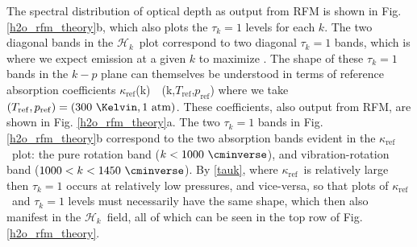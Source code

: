 \documentclass[10pt]{article}
\newcommand{\ch}{\ensuremath{\mathcal{H}}}
\newcommand{\chk}{\ensuremath{\ch_k}}
\newcommand{\tauk}{\ensuremath{\tau_k}}
\newcommand{\kapparef}{\ensuremath{\kappa_{\mathrm{ref}}}}
\newcommand{\Tref}{\ensuremath{T_{\mathrm{ref}}}}
\newcommand{\pref}{\ensuremath{p_{\mathrm{ref}}}}
\begin{document}
 The spectral distribution of optical depth as output from RFM is shown in Fig. \ref{h2o_rfm_theory}b, which also plots the $\tauk=1$ levels for each $k$. The two diagonal bands in the \chk\ plot correspond to two diagonal $\tauk=1$ bands, which is where we expect emission at a given $k$ to maximize \citep[e.g.][we discuss the basis for this `$\tau=1$ law' below]{petty2006}. The shape of these $\tauk=1$ bands in the $k-p$ plane can themselves be understood in terms of reference absorption coefficients 
 \beqn
  \kapparef(k)\ \equiv  \ \kappa(k,\Tref,\pref)
  \eeqn
  where we take $(\Tref,\pref)=(300\ \Kelvin, 1\ \text{atm})$. These coefficients, also output from RFM, are shown in  Fig. \ref{h2o_rfm_theory}a. The two $\tauk=1$ bands  in Fig. \ref{h2o_rfm_theory}b correspond to the two absorption bands evident in the \kapparef\ plot: the pure rotation band ($k < 1000\ \cminverse$), and vibration-rotation band ($1000 < k< 1450 \ \cminverse$). By \eqref{tauk}, where \kapparef\ is relatively large then $\tauk=1$  occurs at relatively low pressures,  and vice-versa, so that plots of \kapparef\ and $\tauk=1$ levels must necessarily have the same shape, which then also manifest in the \chk\ field, all of which can be seen in the top row of Fig. \ref{h2o_rfm_theory}. 

\end{document}
